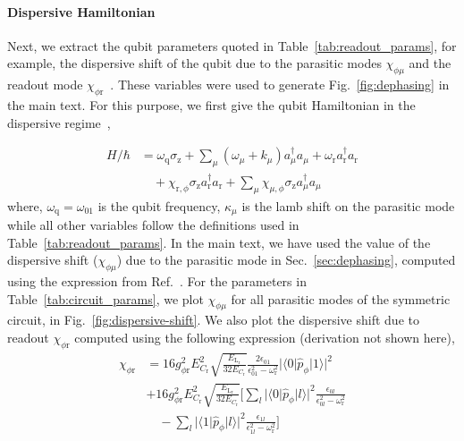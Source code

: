 \documentclass[%
reprint,
superscriptaddress,
 amsmath,amssymb,
 aps,
 prx,
longbibliography,
floatfix,
]{revtex4-2}
\begin{document}
\paragraph{Dispersive Hamiltonian}\label{app:dispersive} 
Next, we extract the qubit parameters quoted in Table~\ref{tab:readout_params}, for example, the dispersive shift of the qubit due to the parasitic modes $\chi_{\phi\mu}$ and the readout mode $\chi_{\phi \textrm{r}}$~\cite{viola2015collective}. These variables were used to generate Fig.~\ref{fig:dephasing} in the main text. For this purpose, we first give the qubit Hamiltonian in the dispersive regime~\cite{viola2015collective},

\begin{align}
    H/\hbar&=\omega_\textrm{q}\sigma_\textrm{z}+\sum_{\mu}(\omega_\mu+k_\mu) a_\mu^\dagger a_\mu
    +\omega_\textrm{r} a_\textrm{r}^\dagger a_\textrm{r}\nonumber\\ &\quad +\chi_{\textrm{r},\phi}\sigma_\textrm{z} a_\textrm{r}^\dagger a_\textrm{r}
    +\sum_{\mu}\chi_{\mu,\phi}\sigma_\textrm{z} a_\mu^\dagger a_\mu\label{eq:dispersive}
\end{align}
where, $\omega_\textrm{q}=\omega_{01}$ is the qubit frequency, $\kappa_\mu$ is the lamb shift on the parasitic mode while all other variables follow the definitions used in Table~\ref{tab:readout_params}. In the main text, we have used the value of the dispersive shift ($\chi_{\phi\mu}$) due to the parasitic mode in Sec.~\ref{sec:dephasing}, computed using the expression from Ref.~\cite{viola2015collective}. For the parameters in Table~\ref{tab:circuit_params}, we plot $\chi_{\phi\mu}$ for all parasitic modes of the symmetric circuit, in Fig.~\ref{fig:dispersive-shift}. We also plot the dispersive shift due to readout $\chi_{\phi \textrm{r}}$ computed using the following expression (derivation not shown here),
\begin{align}  
\chi_{\phi \textrm{r}}&=16g_{\phi\textrm{r}}^2E_{C_\textrm{r}}^2\sqrt{\frac{E_{\textrm{L}_\textrm{r}}}{32E_{C_\textrm{r}}}}\frac{2\epsilon_{01}}{\epsilon_{01}^2-\omega_\textrm{r}^2}|\langle 0|\hat p_\phi|1 \rangle|^2\nonumber\\
   &+16g_{\phi\textrm{r}}^2E_{C_\textrm{r}}^2\sqrt{\frac{E_{\textrm{L}_\textrm{r}}}{32E_{C_\textrm{r}}}}\Bigg[\sum_l|\langle 0|\hat p_\phi|l \rangle|^2\frac{\epsilon_{0l}}{\epsilon_{0l}^2-\omega_\textrm{r}^2}\nonumber\\&\quad-\sum_l|\langle 1|\hat p_\phi|l \rangle|^2\frac{\epsilon_{1l}}{\epsilon_{1l}^2-\omega_\textrm{r}^2}\Bigg]\label{eq:qubit-readout-shift}
\end{align}
\end{document}
